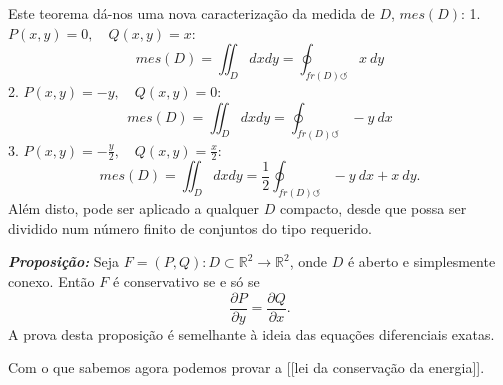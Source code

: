 \documentclass[
]{article}
\begin{document}
Este teorema dá-nos uma nova caracterização da medida de \(D\),
\(mes(D)\): 1. \(P(x,y)=0,\quad Q(x,y)=x:\)
\[mes(D)=\iint_{D}dxdy=\oint_{fr(D)\circlearrowleft}x\ dy\] 2.
\(P(x,y)=-y,\quad Q(x,y)=0:\)
\[mes(D)=\iint_{D}dxdy=\oint_{fr(D)\circlearrowleft}-y\ dx\] 3.
\(P(x,y)=-\frac{y}{2},\quad Q(x,y)=\frac{x}{2}:\)
\[mes(D)=\iint_{D}dxdy=\frac{1}{2}\oint_{fr(D)\circlearrowleft}-y\ dx+x\ dy.\]
Além disto, pode ser aplicado a qualquer \(D\) compacto, desde que possa
ser dividido num número finito de conjuntos do tipo requerido.

\textbf{\emph{Proposição:}} Seja
\(F=(P,Q):D\subset \mathbb{R}^2\to \mathbb{R}^2\), onde \(D\) é aberto e
simplesmente conexo. Então \(F\) é conservativo se e só se
\[\frac{\partial{P}}{\partial y}=\frac{\partial{Q}}{\partial x}.\] A
prova desta proposição é semelhante à ideia das equações diferenciais
exatas.

Com o que sabemos agora podemos provar a {[}{[}lei da conservação da
energia{]}{]}.
\end{document}
